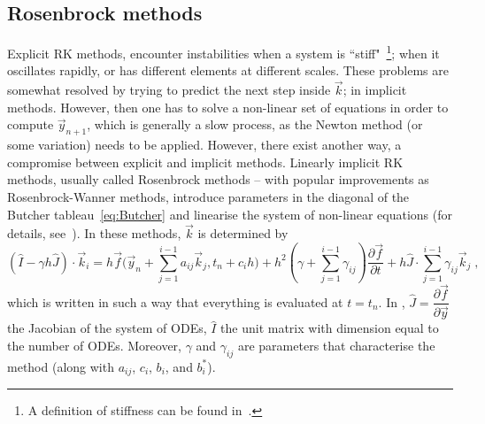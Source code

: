\documentclass[11pt,a4paper]{article}
\begin{document}
\subsection{Rosenbrock methods}
%
Explicit RK methods, encounter instabilities when a system is ``stiff"~\footnote{A definition of stiffness can be found in~\cite{hairer2010solving,Hairer}.}; \eg when it oscillates rapidly, or has different elements at different scales. These problems are somewhat resolved by trying to predict the next step inside $\vec{k}$; \ie in implicit methods. However, then one has to solve a non-linear set of equations in order to compute $\vec{y}_{n+1}$, which is generally a slow process, as the Newton method (or some variation) needs to be applied. However, there exist another way, a compromise between explicit and implicit methods.  Linearly implicit RK methods, usually called Rosenbrock methods -- with popular improvements as Rosenbrock-Wanner methods, introduce  parameters in the diagonal of the Butcher tableau~\ref{eq:Butcher} and linearise the system of  non-linear equations (for details, see~\cite{hairer2010solving}). In these methods, $\vec{k}$ is determined by  
%
\begin{equation}
	\left(\hat I - \gamma h \hat{J}\right)\cdot \vec{k}_{i}=
	h \vec{f}\Big(\vec{y}_n+\sum_{j=1}^{i-1}a_{ij}\vec{k}_{j},t_n + c_{i}h \Big)+
	h^2 \left(\gamma + \sum_{j=1}^{i-1}\gamma_{ij}\right)\dfrac{\partial \vec{f} }{\partial t}+
	h \hat J \cdot \sum_{j=1}^{i-1}\gamma_{ij} \vec{k}_{j}\; ,
	\label{eq:Ros_k}
\end{equation}
%
which is written in such a way that everything is evaluated at $t = t_{n}$. In ,  $\hat J = \dfrac{\partial \vec f}{ \partial \vec y}$ the Jacobian of the system of ODEs, $\hat I$ the unit matrix with dimension equal to the number of ODEs. Moreover, $\gamma$ and $\gamma_{ij}$ are parameters that characterise the method (along with $a_{ij}$, $c_i$,  $b_i$, and $b_i^{*}$).
\end{document}
